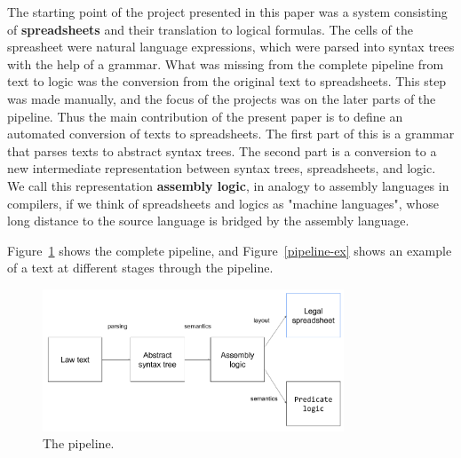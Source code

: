 \documentclass{IOS-Book-Article}
\begin{document}
The starting point of the project presented in this paper was a system consisting of \textbf{spreadsheets} and their translation to logical formulas.
The cells of the spreasheet were natural language expressions, which were parsed into syntax trees with the help of a grammar.
What was missing from the complete pipeline from text to logic was the conversion from the original text to spreadsheets.
This step was made manually, and the focus of the projects was on the later parts of the pipeline.
Thus the main contribution of the present paper is to define an automated conversion of texts to spreadsheets.
The first part of this is a grammar that parses texts to abstract syntax trees.
The second part is a conversion to a new intermediate representation between syntax trees, spreadsheets, and logic.
We call this representation \textbf{assembly logic}, in analogy to assembly languages in compilers, if we think of spreadsheets and logics as "machine languages", whose long distance to the source language is bridged by the assembly language.

Figure~\ref{pipeline} shows the complete pipeline, and Figure~\ref{pipeline-ex} shows an example of a text at different stages through the pipeline.

\begin{figure}
 \includegraphics[width=0.8\textwidth]{pipeline.png}
\caption{The pipeline.}
\label{pipeline}
\end{figure}
\end{document}
